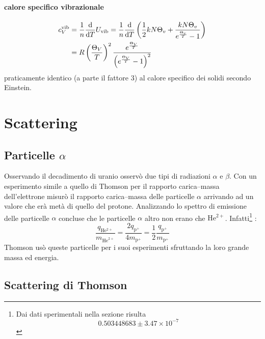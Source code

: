 \subsubsection{calore specifico vibrazionale}
\begin{equation}
	\begin{split}
		c_V^{\text{vib}}&=\frac{1}{n}\frac{\mathrm{d}}{\mathrm{d} T}U_\text{vib}=\frac{1}{n}\frac{\mathrm{d}}{\mathrm{d} T}\left(\frac{1}{2}kN\Theta_v+\frac{kN\Theta_v}{e^{\frac{\Theta_v}{T}}-1}\right)\\
		&=R\left(\frac{\Theta_V}{T}\right)^2\frac{e^{\frac{\Theta_V}{T}}}{\left(e^{\frac{\Theta_V}{T}}-1\right)^2}
	\end{split}
\end{equation}
praticamente identico (a parte il fattore $3$) al calore specifico dei solidi secondo Einstein.









\chapter{Scattering}
\minitoc
\section{Particelle \texorpdfstring{$\alpha$}{alfa}}
Osservando il decadimento di uranio osservò due tipi di radiazioni $\alpha$ e $\beta$. Con un esperimento simile a quello di Thomson per il rapporto carica--massa dell'elettrone misurò il rapporto carica--massa delle particelle $\alpha$ arrivando ad un valore che erà metà di quello del protone. Analizzando lo spettro di emissione delle particelle $\alpha$ concluse che le particelle $\alpha$ altro non erano che $\mathrm{He}^{2+}$. Infatti\footnote{Dai dati sperimentali nella sezione risulta
	\[
		0.503448683\pm 3.47\times 10^{-7}
	\]
}
:
\[
	\frac{q_{\mathrm{He^{2+}}}}{m_{\mathrm{He}^{2+}}}=\frac{2q_{\mathrm{p}^+}}{4m_{\mathrm{p}^+}}=\frac{1}{2}\frac{q_{\mathrm{p}^+}}{m_{\mathrm{p}^+}}
\]
Thomson usò queste particelle per i suoi esperimenti sfruttando la loro grande massa ed energia.
\section{Scattering di Thomson}
